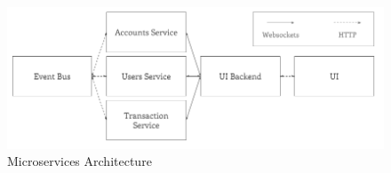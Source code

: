 \begin{figure}[ht]
\begin{center}
\includegraphics[width=15cm]{figures/microservices}
\end{center}
\caption{Microservices Architecture}
\label{fig:microservices}
\end{figure}